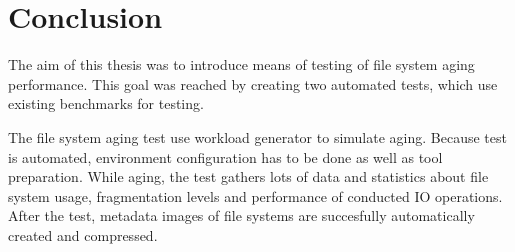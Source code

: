 \documentclass[
  color, %
  table, %
  lof,   %
  lot,   %
]{fithesis3}
\begin{document}











\chapter{Conclusion}
\label{conclusion}

The aim of this thesis was to introduce means of testing of file system aging performance. This goal was reached by creating two automated tests, which use existing benchmarks for testing.

The file system aging test use workload generator to simulate aging. Because test is automated, environment configuration has to be done as well as tool preparation. While aging, the test gathers lots of data and statistics about file system usage, fragmentation levels and performance of conducted IO operations. After the test, metadata images of file systems are succesfully automatically created and compressed. 
\end{document}
